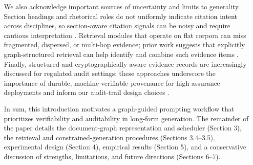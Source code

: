 We also acknowledge important sources of uncertainty and limits to generality.
Section headings and rhetorical roles do not uniformly indicate citation intent across disciplines, so section-aware citation signals can be noisy and require cautious interpretation \cite{web_thelwall_2019_should_citations_be_counted_separately_from_each}.
Retrieval modules that operate on flat corpora can miss fragmented, dispersed, or multi-hop evidence; prior work suggests that explicitly graph-structured retrieval can help identify and combine such evidence items \cite{web_mongiov_2021_graph_based_retrieval_for_claim_verification_ove}.
Finally, structured and cryptographically-aware evidence records are increasingly discussed for regulated audit settings; these approaches underscore the importance of durable, machine-verifiable provenance for high-assurance deployments and inform our audit-trail design choices \cite{web_kao_2025_quantum_adversary_resilient_evidence_structures_}.

In sum, this introduction motivates a graph-guided prompting workflow that prioritizes verifiability and auditability in long-form generation.
The remainder of the paper details the document-graph representation and scheduler (Section 3), the retrieval and constrained-generation procedures (Sections 3.4–3.5), experimental design (Section 4), empirical results (Section 5), and a conservative discussion of strengths, limitations, and future directions (Sections 6–7).
